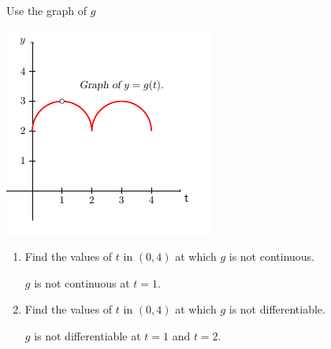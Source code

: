 \documentclass[nooutcomes]{ximera}
\begin{document}
\begin{problem}
  Use the graph of $g$
			\begin{image}
	 		\includegraphics{Figure3.png}
			\end{image}
			

	\begin{enumerate}
	
	\item Find the values of $t$ in $(0,4)$ at which $g$ is not continuous.
		\begin{freeResponse}
		$g$ is not continuous at $t=1$.
		\end{freeResponse}
		
		
	
	\item Find the values of $t$ in $(0,4)$ at which $g$ is not differentiable.
		\begin{freeResponse}
		$g$ is not differentiable at $t=1$ and $t=2$.
		\end{freeResponse}
		
		\end{enumerate}



\end{problem}
	
\end{document}
